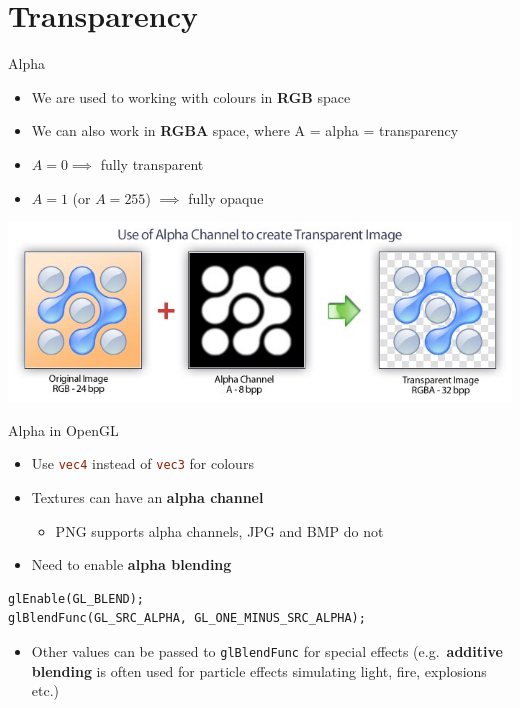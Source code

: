 \part{Transparency}
\frame{\partpage}

\begin{frame}{Alpha}
	\begin{itemize}
		\pause\item We are used to working with colours in \textbf{RGB} space
		\pause\item We can also work in \textbf{RGBA} space, where A = alpha = transparency
		\pause\item $A=0 \implies$ fully transparent
		\pause\item $A=1$ (or $A=255$) $\implies$ fully opaque
	\end{itemize}
	\pause
	\begin{center}
		\includegraphics[width=\textwidth]{alpha_channel}
	\end{center}
\end{frame}

\begin{frame}[fragile]{Alpha in OpenGL}
	\begin{itemize}
		\pause\item Use \lstinline[language=GLSL]{vec4} instead of \lstinline[language=GLSL]{vec3} for colours
		\pause\item Textures can have an \textbf{alpha channel}
			\begin{itemize}
				\pause\item PNG supports alpha channels, JPG and BMP do not
			\end{itemize}
		\pause\item Need to enable \textbf{alpha blending}
	\end{itemize}
	\pause
	\begin{lstlisting}
glEnable(GL_BLEND);
glBlendFunc(GL_SRC_ALPHA, GL_ONE_MINUS_SRC_ALPHA);
	\end{lstlisting}
	\begin{itemize}	
		\pause\item Other values can be passed to \lstinline{glBlendFunc} for special effects
			(e.g.\ \textbf{additive blending} is often used for particle effects simulating
				light, fire, explosions etc.)
	\end{itemize}
\end{frame}

